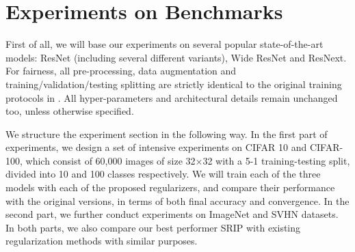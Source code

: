\documentclass{article}
\newcounter{ass_counter}
\begin{document}
\section{Experiments on Benchmarks}

First of all, we will base our experiments on several popular state-of-the-art models: ResNet\cite{he2016deep,he2016identity} (including several different variants), Wide ResNet\cite{zagoruyko2016wide} and ResNext\cite{xie2017aggregated}. For fairness, all pre-processing, data augmentation and training/validation/testing splitting are strictly identical to the original training protocols in \cite{zagoruyko2016wide,he2016deep,he2016identity,xie2017aggregated}. All hyper-parameters and architectural details remain unchanged too, unless otherwise specified.

We structure the experiment section in the following way. In the first part of experiments, we design a set of intensive experiments on CIFAR 10 and CIFAR-100, which consist of 60,000 images of size 32$\times$32 with a 5-1 training-testing split, divided into 10 and 100 classes respectively. We will train each of the three models with each of the proposed regularizers, and compare their performance with the original versions, in terms of both final accuracy and convergence. In the second part, we further conduct experiments on ImageNet and SVHN datasets. In both parts, we also compare our best performer SRIP with existing regularization methods with similar purposes.
\end{document}
